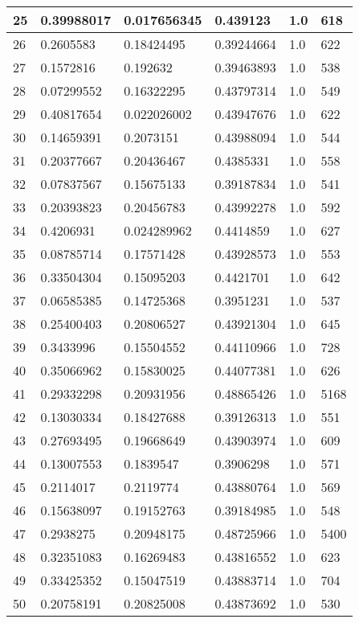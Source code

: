 \begin{longtable}{|l|l|l|l|l|l|}
25 & 0.39988017 & 0.017656345 & 0.439123 & 1.0 & 618 \\ \hline 
26 & 0.2605583 & 0.18424495 & 0.39244664 & 1.0 & 622 \\ \hline 
27 & 0.1572816 & 0.192632 & 0.39463893 & 1.0 & 538 \\ \hline 
28 & 0.07299552 & 0.16322295 & 0.43797314 & 1.0 & 549 \\ \hline 
29 & 0.40817654 & 0.022026002 & 0.43947676 & 1.0 & 622 \\ \hline 
30 & 0.14659391 & 0.2073151 & 0.43988094 & 1.0 & 544 \\ \hline 
31 & 0.20377667 & 0.20436467 & 0.4385331 & 1.0 & 558 \\ \hline 
32 & 0.07837567 & 0.15675133 & 0.39187834 & 1.0 & 541 \\ \hline 
33 & 0.20393823 & 0.20456783 & 0.43992278 & 1.0 & 592 \\ \hline 
34 & 0.4206931 & 0.024289962 & 0.4414859 & 1.0 & 627 \\ \hline 
35 & 0.08785714 & 0.17571428 & 0.43928573 & 1.0 & 553 \\ \hline 
36 & 0.33504304 & 0.15095203 & 0.4421701 & 1.0 & 642 \\ \hline 
37 & 0.06585385 & 0.14725368 & 0.3951231 & 1.0 & 537 \\ \hline 
38 & 0.25400403 & 0.20806527 & 0.43921304 & 1.0 & 645 \\ \hline 
39 & 0.3433996 & 0.15504552 & 0.44110966 & 1.0 & 728 \\ \hline 
40 & 0.35066962 & 0.15830025 & 0.44077381 & 1.0 & 626 \\ \hline 
41 & 0.29332298 & 0.20931956 & 0.48865426 & 1.0 & 5168 \\ \hline 
42 & 0.13030334 & 0.18427688 & 0.39126313 & 1.0 & 551 \\ \hline 
43 & 0.27693495 & 0.19668649 & 0.43903974 & 1.0 & 609 \\ \hline 
44 & 0.13007553 & 0.1839547 & 0.3906298 & 1.0 & 571 \\ \hline 
45 & 0.2114017 & 0.2119774 & 0.43880764 & 1.0 & 569 \\ \hline 
46 & 0.15638097 & 0.19152763 & 0.39184985 & 1.0 & 548 \\ \hline 
47 & 0.2938275 & 0.20948175 & 0.48725966 & 1.0 & 5400 \\ \hline 
48 & 0.32351083 & 0.16269483 & 0.43816552 & 1.0 & 623 \\ \hline 
49 & 0.33425352 & 0.15047519 & 0.43883714 & 1.0 & 704 \\ \hline 
50 & 0.20758191 & 0.20825008 & 0.43873692 & 1.0 & 530 \\ \hline 
\end{longtable}